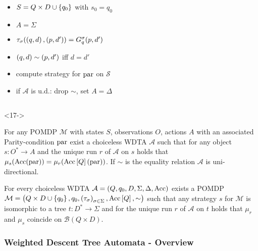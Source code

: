 \documentclass{beamer}
\begin{document}
\begin{frame}
\begin{onlyenv}
\begin{overlayarea}{\textwidth}{0.8\textheight}
\begin{columns}
\begin{column}{0.65\textwidth}
\begin{onlyenv}
\begin{itemize}
                \item<11-> $S = Q\times D\cup\left\{q_{0}\right\}$ with
                  $s_{0} = q_{0}$
                \item<12-> $A = \Sigma$
                \item<13-> $\tau_{\sigma}(\left(q, d\right), \left(p, d'\right)) = 
                  G_{q}^{\sigma}(p, d')$
                \item<14-> $\left(q, d\right)\sim\left(p, d'\right)$ iff $d = d'$
                \item<15-> compute strategy for $\operatorname{par}$ on $\mathcal{S}$
                \item<16-> if $\mathcal{A}$ is u.d.: drop $\sim$, set 
                  $A = \Delta$
              \end{itemize}
            \end{onlyenv}
          \end{column}
        \end{columns}
    \end{overlayarea}
    \end{onlyenv}
    \begin{onlyenv}<17->
      \begin{theorem}
        For any \ac{POMDP} $\mathcal{M}$ with states $S$, observations $O$,
        actions $A$ with an associated Parity-condition $\operatorname{par}$ exist a
        choiceless \ac{WDTA} $\mathcal{A}$ such that for any object
        $s:O^{*}\rightarrow A$ and the unique run $r$ of $\mathcal{A}$ on $s$
        holds that $\mu_{s}(\operatorname{Acc}(\operatorname{par})) =
        \mu_{r}(\operatorname{Acc}\left[Q\right](\operatorname{par}))$. If $\sim$ is the equality relation
        $\mathcal{A}$ is uni-directional.
      \end{theorem}
      \begin{theorem}
        For every choiceless \ac{WDTA} 
        $\mathcal{A} = \left(Q, q_{0}, D, \Sigma, \Delta, \operatorname{Acc}\right)$ exists a
        \ac{POMDP} $\mathcal{M} = \left(Q\times D\cup\left\{q_{0}\right\}, q_{0},
        \left(\tau_{\sigma}\right)_{\sigma\in\Sigma}, \operatorname{Acc}\left[Q\right], \sim\right)$ such
        that any strategy $s$ for $\mathcal{M}$ is isomorphic to a tree
        $t:D^{*}\rightarrow\Sigma$ and for the unique run $r$ of $\mathcal{A}$
        on $t$ holds that $\mu_{r}$ and $\mu_{s}$ coincide on
        $\mathcal{B}(Q\times D)$.
      \end{theorem}
    \end{onlyenv}
  \end{frame}

  \begin{frame}
    \frametitle{Weighted Descent Tree Automata - Overview}
  \end{frame}
\end{document}
